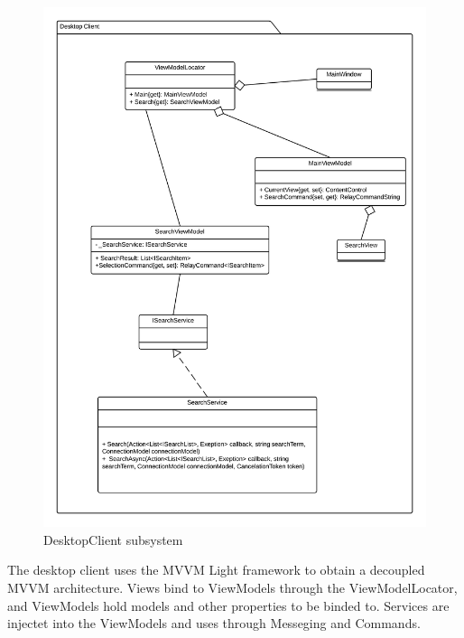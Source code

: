 \begin{figure}[H]
\includegraphics[width=\linewidth]{img/SDD/DesktopClientSubsystem.png}
\caption{DesktopClient subsystem}
\label{fig:DesktopClientSubsystem}
\end{figure}

The desktop client uses the MVVM Light framework to obtain a decoupled MVVM architecture. Views bind to ViewModels through the ViewModelLocator, and ViewModels hold models and other properties to be binded to. Services are injectet into the ViewModels and uses through Messeging and Commands.


